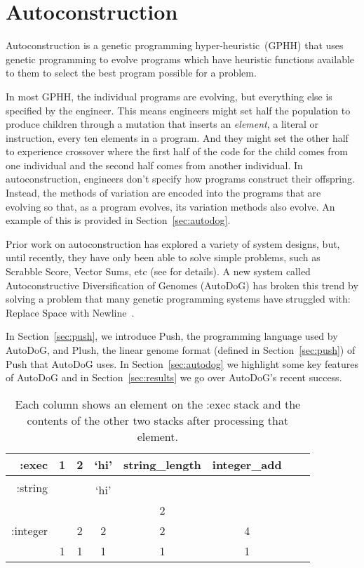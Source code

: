 \documentclass{sig-alternate}
\begin{document}
\section{Autoconstruction}
\label{sec:ac}
Autoconstruction is a genetic programming hyper-heur\-istic~(GPHH) that uses genetic programming to evolve programs which have heuristic functions available to them to select the best program possible for a problem. 

In most GPHH, the individual programs are evolving, but everything else is specified by the engineer. This means engineers might set half the population to produce children through a mutation that inserts an \textit{element}, a literal or instruction, every ten elements in a program. And they might set the other half to experience crossover where the first half of the code for the child comes from one individual and the second half comes from another individual. In autoconstruction, engineers don't specify how programs construct their offspring. Instead, the methods of variation are encoded into the programs that are evolving so that, as a program evolves, its variation methods also evolve. An example of this is provided in Section~\ref{sec:autodog}.

Prior work on autoconstruction has explored a variety of system designs, but, until recently, they have only been able to solve simple problems, such as Scrabble Score, Vector Sums, etc (see \cite{helmuth:2015} for details). A new system called Autoconstructive Diversification of Genomes (AutoDoG) has broken this trend by solving a problem that many genetic programming systems have struggled with: Replace Space with Newline~\cite{spector:2016}.

In Section~\ref{sec:push}, we introduce Push, the programming language used by AutoDoG, and Plush, the linear genome format (defined in Section~\ref{sec:push}) of Push that AutoDoG uses. In Section~\ref{sec:autodog} we highlight some key features of AutoDoG and in Section~\ref{sec:results} we go over AutoDoG's recent success.

\begin{table}
	\centering
	\begin{tabular}{|r|c|c|c|c|c|c|c|}
		\hline
		:exec & 1 & 2 & `hi' & string\_length & integer\_add \\
		\hline
		\hline
		\multirow{2}{*}{:string} & & & & & \\
		& & & `hi' &  &  \\
		\hline
		\multirow{3}{*}{:integer} & & & & 2 & \\
		& & 2 & 2 & 2 & 4 \\
		& 1 & 1 & 1 & 1 & 1\\
		\hline
	\end{tabular}
	\caption{Each column shows an element on the :exec stack and the contents of the other two stacks after processing that element.}
	\label{tab:push}
\end{table}
\end{document}

